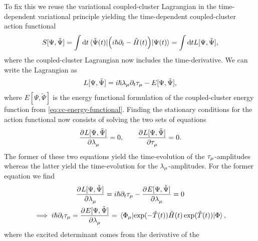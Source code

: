        To fix this we reuse the variational coupled-cluster Lagrangian in the
        time-dependent variational principle yielding the time-dependent
        coupled-cluster action functional \cite{kvaal2013variational}
        \begin{align}
            S[\Psi, \tilde{\Psi}]
            = \int\dd t
            \mel*{\tilde{\Psi}(t)}{
                \left( 
                    i\hslash\partial_t
                    - \hat{H}(t)
                 \right)
            }{\Psi(t)}
            = \int\dd t
            L[\Psi, \tilde{\Psi}],
            \label{eq:cc-action-functional}
        \end{align}
        where the coupled-cluster Lagrangian now includes the time-derivative.
        We can write the Lagrangian as
        \begin{align}
            L[\Psi, \tilde{\Psi}]
            = i\hslash \lambda_{\mu}\partial_t\tau_{\mu}
            - E[\Psi, \tilde{\Psi}],
        \end{align}
        where $E[\Psi, \tilde{\Psi}]$ is the energy functional formulation of
        the coupled-cluster energy function from
        \autoref{eq:cc-energy-functional}.
        Finding the stationary conditions for the action functional now consists
        of solving the two sets of equations
        \begin{align}
            \dpd{L[\Psi, \tilde{\Psi}]}{\clustlamp_{\mu}} = 0,
            \qquad
            \dpd{L[\Psi, \tilde{\Psi}]}{\clustamp_{\mu}} = 0.
        \end{align}
        The former of these two equations yield the time-evolution of the
        $\tau_{\mu}$-amplitudes whereas the latter yield the
        time-evolution for the $\lambda_{\mu}$-amplitudes.
        For the former equation we find
        \begin{gather}
            \dpd{L[\Psi, \tilde{\Psi}]}{\clustlamp_{\mu}}
            =
            i\hslash\partial_t\clustamp_{\mu}
            - \dpd{E[\Psi, \tilde{\Psi}]}{\clustlamp_{\mu}}
            = 0
            \\
            \implies
            i\hslash\partial_t\clustamp_{\mu}
            =
            \dpd{E[\Psi, \tilde{\Psi}]}{\clustlamp_{\mu}}
            =
            \mel*{\slat_{\mu}}{
                \exponential(-\clust(t))
                \hamil(t)
                \exponential(\clust(t))
            }{\slat},
            \label{eq:time-evolution-tau}
        \end{gather}
        where the excited determinant comes from the derivative of the
